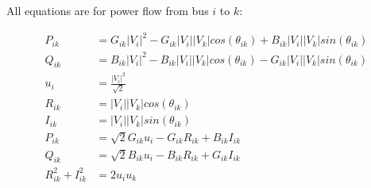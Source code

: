 \documentclass[10pt,a4paper]{article}
\begin{document}
	All equations are for power flow from bus $i$ to $k$:
	
	\begin{align}
		P_{ik} &= G_{ik}|V_i|^2 - G_{ik}|V_i||V_k|cos(\theta_{ik}) + B_{ik}|V_i||V_k|sin(\theta_{ik}) \\
		Q_{ik} &= B_{ik}|V_i|^2 - B_{ik}|V_i||V_k|cos(\theta_{ik}) - G_{ik}|V_i||V_k|sin(\theta_{ik}) \\[10pt]
		u_i &= \frac{|V_i|^2}{\sqrt{2}} \nonumber\\[10pt]
		R_{ik} &= |V_i||V_k|cos(\theta_{ik}) \nonumber\\
		I_{ik} &= |V_i||V_k|sin(\theta_{ik}) \nonumber\\[10pt]
		P_{ik} &= \sqrt{2}G_{ik}u_i - G_{ik}R_{ik} + B_{ik}I_{ik} \\
		Q_{ik} &= \sqrt{2}B_{ik}u_i - B_{ik}R_{ik} + G_{ik}I_{ik} \\
		R_{ik}^2 + I_{ik}^2 &= 2u_iu_k
	\end{align} 
\end{document}
